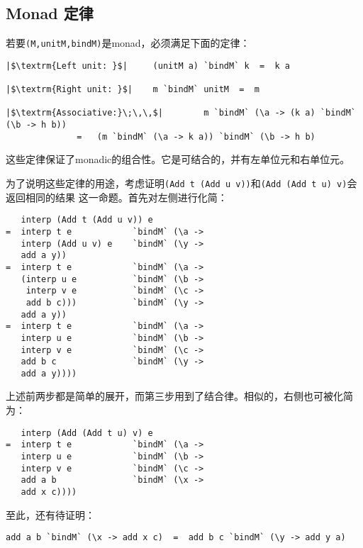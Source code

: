 \documentclass[12pt]{article}
\begin{document}
\subsection{Monad 定律}\label{sec:monad_law}
\noindent{}若要\texttt{(M,unitM,bindM)}是monad，必须满足下面的定律：
\begin{verbatim}
|$\textrm{Left unit: }$|     (unitM a) `bindM` k  =  k a

|$\textrm{Right unit: }$|    m `bindM` unitM  =  m

|$\textrm{Associative:}\;\,\,$|        m `bindM` (\a -> (k a) `bindM` (\b -> h b))
              =   (m `bindM` (\a -> k a)) `bindM` (\b -> h b)
\end{verbatim}
\noindent{}这些定律保证了monadic的组合性。它是可结合的，并有左单位元和右单位元。

\indent{}为了说明这些定律的用途，考虑证明\texttt{(Add t (Add u v))}和\texttt{(Add (Add t u) v)}会返回相同的结果
这一命题。首先对左侧进行化简：
\begin{verbatim}
   interp (Add t (Add u v)) e
=  interp t e            `bindM` (\a ->
   interp (Add u v) e    `bindM` (\y ->
   add a y))
=  interp t e            `bindM` (\a ->
   (interp u e           `bindM` (\b ->
    interp v e           `bindM` (\c ->
    add b c)))           `bindM` (\y ->
   add a y))
=  interp t e            `bindM` (\a ->
   interp u e            `bindM` (\b ->
   interp v e            `bindM` (\c ->
   add b c               `bindM` (\y ->
   add a y))))
\end{verbatim}
\noindent{}上述前两步都是简单的展开，而第三步用到了结合律。相似的，右侧也可被化简为：
\begin{verbatim}
   interp (Add (Add t u) v) e
=  interp t e            `bindM` (\a ->
   interp u e            `bindM` (\b ->
   interp v e            `bindM` (\c ->
   add a b               `bindM` (\x ->
   add x c))))
\end{verbatim}
至此，还有待证明：
\begin{verbatim}
add a b `bindM` (\x -> add x c)  =  add b c `bindM` (\y -> add y a)
\end{verbatim}
\end{document}
